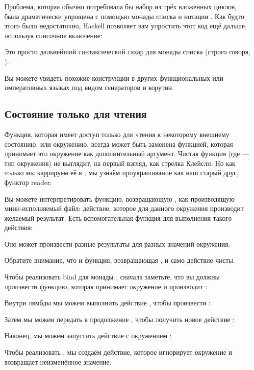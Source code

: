 Проблема, которая обычно потребовала бы набор из трёх вложенных циклов, была
драматически упрощена с помощью монады списка и
нотации . Как будто этого было недостаточно, Haskell позволяет вам
упростить этот код ещё дальше, используя списочное включение:

Это просто дальнейший синтаксический сахар для монады списка (строго
говоря, ).

Вы можете увидеть похожие конструкции в других функциональных или императивных
языках под видом генераторов и корутин.

\subsection{Состояние только для чтения}

Функция, которая имеет доступ только для чтения к некоторому внешнему состоянию, или
окружению, всегда может быть заменена функцией, которая принимает это
окружение как дополнительный аргумент. Чистая функция
 (где  --- тип
окружения) не выглядит, на первый взгляд, как стрелка Клейсли. Но
как только мы каррируем её в
, мы узнаём
приукрашивание как наш старый друг, функтор reader:

Вы можете интерпретировать функцию, возвращающую , как производящую
мини-исполняемый файл: действие, которое для данного окружения производит
желаемый результат. Есть вспомогательная функция  для выполнения
такого действия:

Оно может произвести разные результаты для разных значений
окружения.

Обратите внимание, что и функция, возвращающая , и
само действие  чисты.

Чтобы реализовать bind для монады , сначала заметьте, что вы
должны произвести функцию, которая принимает окружение  и
производит :

Внутри лямбды мы можем выполнить действие , чтобы произвести
:

Затем мы можем передать  в продолжение , чтобы получить новое
действие :

Наконец, мы можем запустить действие  с окружением
:

Чтобы реализовать , мы создаём действие, которое игнорирует
окружение и возвращает неизменённое значение.

